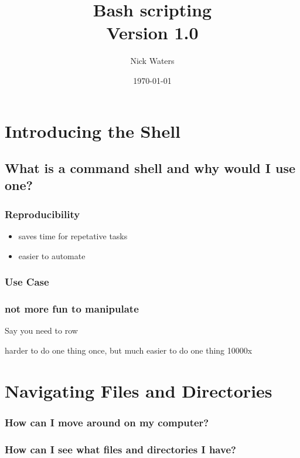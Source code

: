 \documentclass[11pt]{article}
\author{Nick Waters}
\date{\today}
\title{Bash scripting\\\medskip
\large Version 1.0}
\begin{document}
\maketitle
\section*{Introducing the Shell}
\label{sec:org5a577fa}
\subsection*{What is a command shell and why would I use one?}
\label{sec:org0cd04ce}

\subsubsection*{Reproducibility}
\label{sec:org1d9e2c2}
\begin{itemize}
\item saves time for repetative tasks
\item easier to automate
\end{itemize}

\subsubsection*{Use Case}
\label{sec:org0315578}
\subsubsection*{not more fun to manipulate}
\label{sec:org70c4326}
Say you need to row

\begin{NOTES}
harder to do one thing once, but much easier to do one thing 10000x
\end{NOTES}
\section*{Navigating Files and Directories}
\label{sec:org72e084c}

\subsubsection*{How can I move around on my computer?}
\label{sec:org66c6bd2}
\subsubsection*{How can I see what files and directories I have?}
\label{sec:orgf08a3ea}
\end{document}
